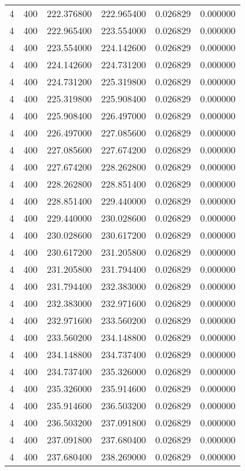 \begin{longtable}{rrrrrr}
4 & 400 & 222.376800 & 222.965400 & 0.026829 & 0.000000 \\
4 & 400 & 222.965400 & 223.554000 & 0.026829 & 0.000000 \\
4 & 400 & 223.554000 & 224.142600 & 0.026829 & 0.000000 \\
4 & 400 & 224.142600 & 224.731200 & 0.026829 & 0.000000 \\
4 & 400 & 224.731200 & 225.319800 & 0.026829 & 0.000000 \\
4 & 400 & 225.319800 & 225.908400 & 0.026829 & 0.000000 \\
4 & 400 & 225.908400 & 226.497000 & 0.026829 & 0.000000 \\
4 & 400 & 226.497000 & 227.085600 & 0.026829 & 0.000000 \\
4 & 400 & 227.085600 & 227.674200 & 0.026829 & 0.000000 \\
4 & 400 & 227.674200 & 228.262800 & 0.026829 & 0.000000 \\
4 & 400 & 228.262800 & 228.851400 & 0.026829 & 0.000000 \\
4 & 400 & 228.851400 & 229.440000 & 0.026829 & 0.000000 \\
4 & 400 & 229.440000 & 230.028600 & 0.026829 & 0.000000 \\
4 & 400 & 230.028600 & 230.617200 & 0.026829 & 0.000000 \\
4 & 400 & 230.617200 & 231.205800 & 0.026829 & 0.000000 \\
4 & 400 & 231.205800 & 231.794400 & 0.026829 & 0.000000 \\
4 & 400 & 231.794400 & 232.383000 & 0.026829 & 0.000000 \\
4 & 400 & 232.383000 & 232.971600 & 0.026829 & 0.000000 \\
4 & 400 & 232.971600 & 233.560200 & 0.026829 & 0.000000 \\
4 & 400 & 233.560200 & 234.148800 & 0.026829 & 0.000000 \\
4 & 400 & 234.148800 & 234.737400 & 0.026829 & 0.000000 \\
4 & 400 & 234.737400 & 235.326000 & 0.026829 & 0.000000 \\
4 & 400 & 235.326000 & 235.914600 & 0.026829 & 0.000000 \\
4 & 400 & 235.914600 & 236.503200 & 0.026829 & 0.000000 \\
4 & 400 & 236.503200 & 237.091800 & 0.026829 & 0.000000 \\
4 & 400 & 237.091800 & 237.680400 & 0.026829 & 0.000000 \\
4 & 400 & 237.680400 & 238.269000 & 0.026829 & 0.000000 \\

\end{longtable}
